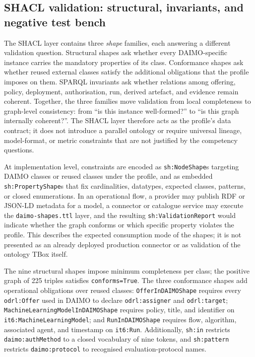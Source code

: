 \documentclass[Afour,sagev,times]{sagej}
\newcommand{\code}[1]{\texttt{#1}}
\begin{document}
\subsection{SHACL validation: structural, invariants, and negative test bench}\label{sec:eval-invariants}

The SHACL layer contains three \emph{shape} families, each answering a different validation question. Structural shapes ask whether every DAIMO-specific instance carries the mandatory properties of its class. Conformance shapes ask whether reused external classes satisfy the additional obligations that the profile imposes on them. SPARQL invariants ask whether relations among offering, policy, deployment, authorisation, run, derived artefact, and evidence remain coherent. Together, the three families move validation from local completeness to graph-level consistency: from ``is this instance well-formed?'' to ``is this graph internally coherent?''. The SHACL layer therefore acts as the profile's data contract; it does not introduce a parallel ontology or require universal lineage, model-format, or metric constraints that are not justified by the competency questions.

At implementation level, constraints are encoded as \code{sh:NodeShape}s targeting DAIMO classes or reused classes under the profile, and as embedded \code{sh:PropertyShape}s that fix cardinalities, datatypes, expected classes, patterns, or closed enumerations. In an operational flow, a provider may publish RDF or JSON-LD metadata for a model, a connector or catalogue service may execute the \code{daimo-shapes.ttl} layer, and the resulting \code{sh:ValidationReport} would indicate whether the graph conforms or which specific property violates the profile. This describes the expected consumption mode of the shapes; it is not presented as an already deployed production connector or as validation of the ontology TBox itself.

The nine structural shapes impose minimum completeness per class; the positive graph of 225 triples satisfies \code{conforms=True}. The three conformance shapes add operational obligations over reused classes: \code{OfferInDAIMOShape} requires every \code{odrl:Offer} used in DAIMO to declare \code{odrl:assigner} and \code{odrl:target}; \code{MachineLearningModelInDAIMOShape} requires policy, title, and identifier on \code{it6:MachineLearningModel}; and \code{RunInDAIMOShape} requires flow, algorithm, associated agent, and timestamp on \code{it6:Run}. Additionally, \code{sh:in} restricts \code{daimo:authMethod} to a closed vocabulary of nine tokens, and \code{sh:pattern} restricts \code{daimo:protocol} to recognised evaluation-protocol names.
\end{document}
